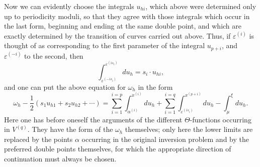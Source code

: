 \documentclass[10pt]{article}
\begin{document}
Now we can evidently choose the integrals \(u_{hi}\), which above were determined only up to periodicity moduli, so that they agree with those integrals which occur in the last form, beginning and ending at the same double point, and which are exactly determined by the transition of curves carried out above. Thus, if \(\varepsilon^{(i)}\) is thought of as corresponding to the first parameter of the integral \(u_{p+i}\), and \(\varepsilon^{(-i)}\) to the second, then
\[
\int_{\varepsilon^{(-is_i)}}^{\varepsilon^{(is_i)}}du_h=s_i\cdot u_{hi},
\]
and one can put the above equation for \(\omega_h\) in the form
\[
\omega_h-\frac12(s_1u_{h1}+s_2u_{h2}+\cdots)
=\sum_{i=1}^{i=p}\int_{\alpha^{(i)}}^{x^{(i)}}du_h
+\sum_{i=1}^{i=q}\int_{\varepsilon^{(is_i)}}^{x^{(p+i)}}du_h-\int_{\mu}^{\xi}du_h.
\]
Here one has before oneself the arguments of the different \(\Theta\)-functions occurring in \(V^{(q)}\). They have the form of the \(\omega_h\) themselves; only here the lower limits are replaced by the points \(\alpha\) occurring in the original inversion problem and by the preferred double points themselves, for which the appropriate direction of continuation must always be chosen.
\end{document}
